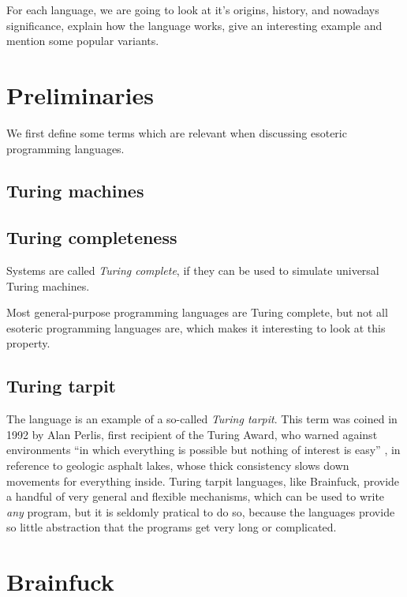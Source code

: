 \documentclass{sig-alternate}
\begin{document}
For each language, we are going to look at it's origins, history, and nowadays significance, explain how the language works, give an interesting example and mention some popular variants.

\section{Preliminaries}

We first define some terms which are relevant when discussing esoteric programming languages.

\subsection{Turing machines}

\cite{turing1937computable}

\subsection{Turing completeness}

Systems are called \emph{Turing complete}, if they can be used to simulate universal Turing machines.


Most general-purpose programming languages are Turing complete, but not all esoteric programming languages are, which makes it interesting to look at this property.

\subsection{Turing tarpit}

The language is an example of a so-called \emph{Turing tarpit}. This term was coined in 1992 by Alan Perlis, first recipient of the Turing Award, who warned against environments “in which everything is possible but nothing of interest is easy” \cite{perlis1982epigrams}, in reference to geologic asphalt lakes, whose thick consistency slows down movements for everything inside. Turing tarpit languages, like Brainfuck, provide a handful of very general and flexible mechanisms, which can be used to write \emph{any} program, but it is seldomly pratical to do so, because the languages provide so little abstraction that the programs get very long or complicated.

\newpage
\section{Brainfuck}
\end{document}
